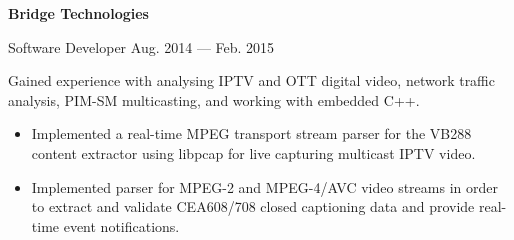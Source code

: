 \parbox[t][][t]{\linewidth}{
	\parbox{\linewidth}{\textbf{Bridge Technologies}}
	\smallbreak
	\smallskip
	{\hfill\parbox{\linewidth}{
		{Software Developer}
		\hfill {{Aug. 2014 --- Feb. 2015}}
	}
	}

	\smallskip

	Gained experience with analysing IPTV and OTT digital video, network traffic analysis,
	PIM-SM multicasting, and working with embedded C++.

	\bigskip
	\begin{itemize}
		\item{Implemented a real-time MPEG transport stream parser for the VB288 content extractor using libpcap for live capturing
			multicast IPTV video.}\\[-.6em]
		\item{Implemented parser for MPEG-2 and MPEG-4/AVC video streams in order to extract and
			validate CEA608/708 closed captioning data and provide real-time event notifications.}

	\end{itemize}
	\bigskip
	\bigskip
}


